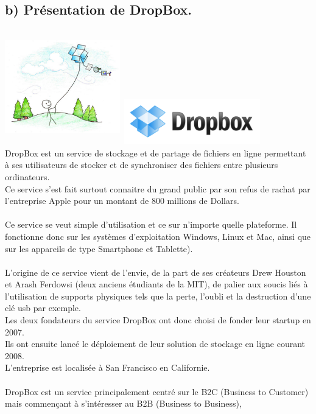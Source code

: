 \documentclass[a4paper, 10pt]{article}
\begin{document}
\subsection*{b) Présentation de DropBox.}
\includegraphics[height = 5cm, width = 5cm]{jpg/db2.jpg}
\includegraphics[height = 2cm, width = 6cm]{jpg/dropbox_logo.png}\\
DropBox est un service de stockage et de partage de fichiers en ligne permettant à ses utilisateurs de stocker et
de synchroniser des fichiers entre plusieurs ordinateurs.\\
Ce service s'est fait surtout connaitre du grand public par son refus de rachat
par l'entreprise Apple pour un montant de 800 millions de Dollars.\\ \\
Ce service se veut simple d'utilisation et ce sur n'importe quelle plateforme.
Il fonctionne donc sur les systèmes d'exploitation Windows, Linux et Mac, ainsi que sur les appareils de type Smartphone et Tablette).\\ \\
L'origine de ce service vient de l'envie, de la part de ses créateurs Drew Houston et Arash Ferdowsi (deux anciens étudiants de la MIT),
de palier aux soucis liés à l'utilisation de supports physiques tels que la perte, l'oubli et la destruction d'une clé usb par exemple.\\
Les deux fondateurs du service DropBox ont donc choisi de fonder leur startup en 2007.\\
Ils ont ensuite lancé le déploiement de leur solution de stockage en ligne courant 2008.\\
L'entreprise est localisée à San Francisco en Californie.\\ \\
DropBox est un service principalement centré sur le B2C (Business to Customer) mais commençant à s'intéresser au B2B (Business to Business),
\end{document}
